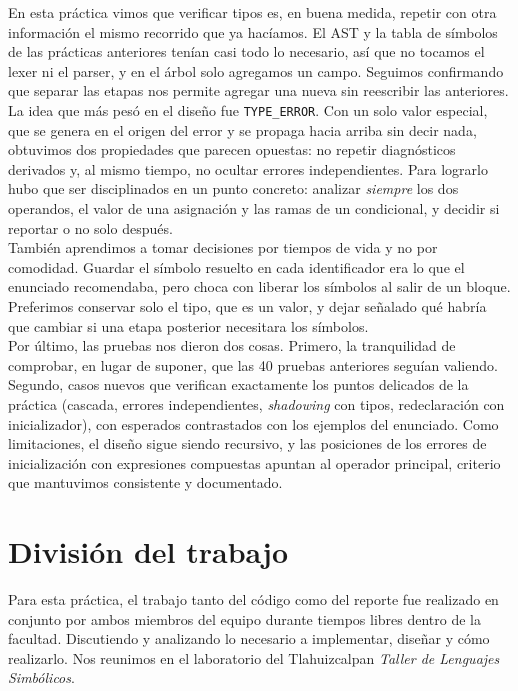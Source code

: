 \documentclass[12pt,letterpaper]{article}
\begin{document}
En esta práctica vimos que verificar tipos es, en buena medida, repetir con otra información el mismo
recorrido que ya hacíamos. El AST y la tabla de símbolos de las prácticas anteriores tenían casi todo lo
necesario, así que no tocamos el lexer ni el parser, y en el árbol solo agregamos un campo. Seguimos
confirmando que separar las etapas nos permite agregar una nueva sin reescribir las anteriores.\\

La idea que más pesó en el diseño fue \texttt{TYPE\_ERROR}. Con un solo valor especial, que se genera en el
origen del error y se propaga hacia arriba sin decir nada, obtuvimos dos propiedades que parecen opuestas: no
repetir diagnósticos derivados y, al mismo tiempo, no ocultar errores independientes. Para lograrlo hubo que ser
disciplinados en un punto concreto: analizar \emph{siempre} los dos operandos, el valor de una asignación y las
ramas de un condicional, y decidir si reportar o no solo después.\\

También aprendimos a tomar decisiones por tiempos de vida y no por comodidad. Guardar el símbolo resuelto en
cada identificador era lo que el enunciado recomendaba, pero choca con liberar los símbolos al salir de un
bloque. Preferimos conservar solo el tipo, que es un valor, y dejar señalado qué habría que cambiar si una
etapa posterior necesitara los símbolos.\\

Por último, las pruebas nos dieron dos cosas. Primero, la tranquilidad de comprobar, en lugar de suponer, que
las 40 pruebas anteriores seguían valiendo. Segundo, casos nuevos que verifican exactamente los puntos delicados
de la práctica (cascada, errores independientes, \emph{shadowing} con tipos, redeclaración con inicializador),
con esperados contrastados con los ejemplos del enunciado. Como limitaciones, el diseño sigue siendo recursivo, y
las posiciones de los errores de inicialización con expresiones compuestas apuntan al operador principal,
criterio que mantuvimos consistente y documentado.

\section*{División del trabajo}
Para esta práctica, el trabajo tanto del código como del reporte fue realizado en conjunto por ambos miembros
del equipo durante tiempos libres dentro de la facultad. Discutiendo y analizando lo necesario a implementar,
diseñar y cómo realizarlo. Nos reunimos en el laboratorio del Tlahuizcalpan
\textit{Taller de Lenguajes Simbólicos}.
\end{document}
